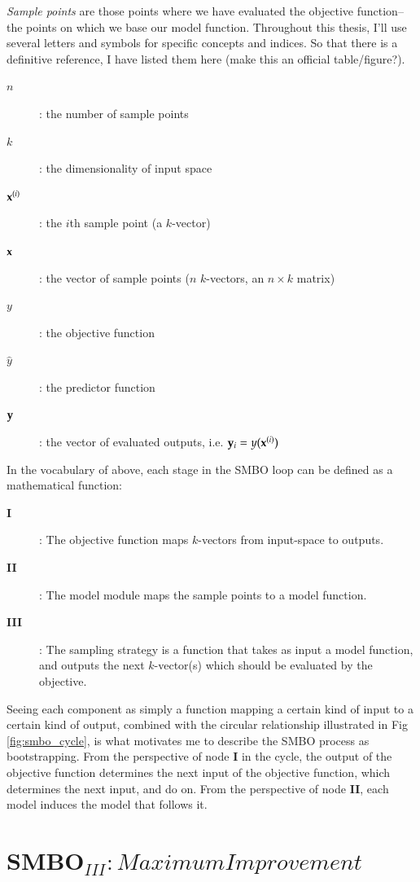 \emph{Sample points} are those points where we have evaluated the objective function--the points on which we base our model function. Throughout this thesis, I'll use several letters and symbols for specific concepts and indices. So that there is a definitive reference, I have listed them here (make this an official table/figure?).

\begin{description}
  \item[$n$]: the number of sample points
  \item[$k$]: the dimensionality of input space
  \item[$\mathbf{x}^{(i)}$]: the $i$th sample point (a $k$-vector)
  \item[$\mathbf{x}$]: the vector of sample points ($n$ $k$-vectors, an $n\times k$ matrix)
  \item[$y$]: the objective function
  \item[$\hat{y}$]: the predictor function
  \item[$\mathbf{y}$]: the vector of evaluated outputs, i.e. $\mathbf{y}_i=y(\mathbf{x}^{(i)})$
\end{description}

In the vocabulary of above, each stage in the SMBO loop can be defined as a mathematical function:
\begin{description}
	\item[\textbf{I}]: The objective function maps $k$-vectors from input-space to outputs.
	\item[\textbf{II}]: The model module maps the sample points to a model function.
	\item[\textbf{III}]: The sampling strategy is a function that takes as input a model function, and outputs the next $k$-vector(s) which should be evaluated by the objective.
\end{description}

Seeing each component as simply a function mapping a certain kind of input to a certain kind of output, combined with the circular relationship illustrated in Fig \ref{fig:smbo_cycle}, is what motivates me to describe the SMBO process as bootstrapping. From the perspective of node \textbf{I} in the cycle, the output of the objective function determines the next input of the objective function, which determines the next input, and do on. From the perspective of node \textbf{II}, each model induces the model that follows it.

\section{SMBO$_{III}: Maximum Improvement$}

